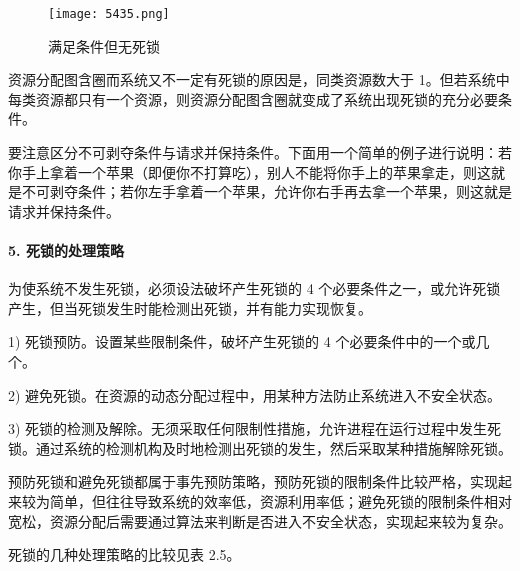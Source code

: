 \documentclass{ctexbook}
\begin{document}
\begin{figure}[h]
	\centering
	\texttt{[image: 5435.png]}
	\caption{满足条件但无死锁}
	\label{fig:satisfy_condition_no_deadlock}
\end{figure}

资源分配图含圈而系统又不一定有死锁的原因是，同类资源数大于 1。但若系统中每类资源都只有一个资源，则资源分配图含圈就变成了系统出现死锁的充分必要条件。

要注意区分不可剥夺条件与请求并保持条件。下面用一个简单的例子进行说明：若你手上拿着一个苹果（即便你不打算吃），别人不能将你手上的苹果拿走，则这就是不可剥夺条件；若你左手拿着一个苹果，允许你右手再去拿一个苹果，则这就是请求并保持条件。

\paragraph{5. 死锁的处理策略}

为使系统不发生死锁，必须设法破坏产生死锁的 4 个必要条件之一，或允许死锁产生，但当死锁发生时能检测出死锁，并有能力实现恢复。

1) 死锁预防。设置某些限制条件，破坏产生死锁的 4 个必要条件中的一个或几个。

2) 避免死锁。在资源的动态分配过程中，用某种方法防止系统进入不安全状态。

3) 死锁的检测及解除。无须采取任何限制性措施，允许进程在运行过程中发生死锁。通过系统的检测机构及时地检测出死锁的发生，然后采取某种措施解除死锁。

预防死锁和避免死锁都属于事先预防策略，预防死锁的限制条件比较严格，实现起来较为简单，但往往导致系统的效率低，资源利用率低；避免死锁的限制条件相对宽松，资源分配后需要通过算法来判断是否进入不安全状态，实现起来较为复杂。

死锁的几种处理策略的比较见表 2.5。
\begin{table}[h]
	\centering
	\caption{死锁处理策略的比较}
	\label{tab:deadlock_strategies}
\end{table}
\end{document}
